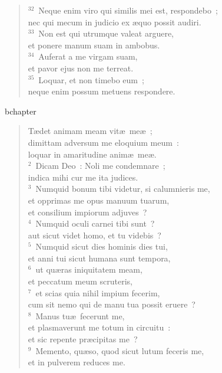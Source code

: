 \begin{flushleft}
\begin{verse}
${}^{32}$~Neque enim viro qui similis mei est, respondebo~;\\ nec qui mecum in judicio ex \ae quo possit audiri.\\
${}^{33}$~Non est qui utrumque valeat arguere,\\ et ponere manum suam in ambobus.\\
${}^{34}$~Auferat a me virgam suam,\\ et pavor ejus non me terreat.\\
${}^{35}$~Loquar, et non timebo eum~;\\ neque enim possum metuens respondere.\end{verse}\end{flushleft}


bchapter\begin{flushleft}\begin{verse}\vspace{-19pt}\hspace{6pt}T\ae det animam meam vit\ae\ me\ae~;\\\hspace{6pt} dimittam adversum me eloquium meum~:\\ loquar in amaritudine anim\ae\ me\ae .\\
${}^{2}$~Dicam Deo~: Noli me condemnare~;\\ indica mihi cur me ita judices.\\
${}^{3}$~Numquid bonum tibi videtur, si calumnieris me,\\ et opprimas me opus manuum tuarum,\\ et consilium impiorum adjuves~?\\
${}^{4}$~Numquid oculi carnei tibi sunt~?\\ aut sicut videt homo, et tu videbis~?\\
${}^{5}$~Numquid sicut dies hominis dies tui,\\ et anni tui sicut humana sunt tempora,\\
${}^{6}$~ut qu\ae ras iniquitatem meam,\\ et peccatum meum scruteris,\\
${}^{7}$~et scias quia nihil impium fecerim,\\ cum sit nemo qui de manu tua possit eruere~?\\
${}^{8}$~Manus tu\ae\ fecerunt me,\\ et plasmaverunt me totum in circuitu~:\\ et sic repente pr\ae cipitas me~?\\
${}^{9}$~Memento, qu\ae so, quod sicut lutum feceris me,\\ et in pulverem reduces me.\\

\end{verse}
\end{flushleft}
